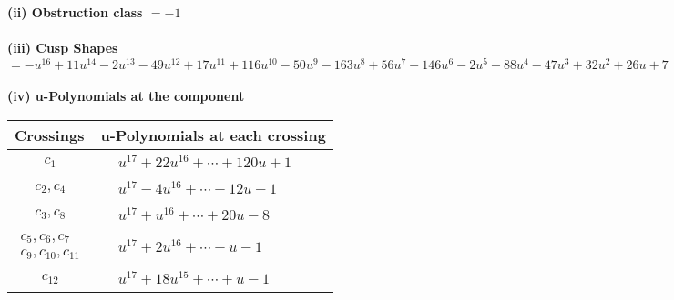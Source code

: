 \documentclass[1p]{elsarticle_modified}
\theoremstyle{definition}
\begin{document}
\flushleft \textbf{(ii) Obstruction class $= -1$}\\~\\
\flushleft \textbf{(iii) Cusp Shapes $= - u^{16}+11 u^{14}-2 u^{13}-49 u^{12}+17 u^{11}+116 u^{10}-50 u^9-163 u^8+56 u^7+146 u^6-2 u^5-88 u^4-47 u^3+32 u^2+26 u+7$}\\~\\
\newpage\renewcommand{\arraystretch}{1}
\flushleft \textbf{(iv) u-Polynomials at the component}\newline \\
\begin{tabular}{m{50pt}|m{274pt}}
Crossings & \hspace{64pt}u-Polynomials at each crossing \\
\hline $$\begin{aligned}c_{1}\end{aligned}$$&$\begin{aligned}
&u^{17}+22 u^{16}+\cdots+120 u+1
\end{aligned}$\\
\hline $$\begin{aligned}c_{2},c_{4}\end{aligned}$$&$\begin{aligned}
&u^{17}-4 u^{16}+\cdots+12 u-1
\end{aligned}$\\
\hline $$\begin{aligned}c_{3},c_{8}\end{aligned}$$&$\begin{aligned}
&u^{17}+u^{16}+\cdots+20 u-8
\end{aligned}$\\
\hline $$\begin{aligned}c_{5},c_{6},c_{7}\\c_{9},c_{10},c_{11}\end{aligned}$$&$\begin{aligned}
&u^{17}+2 u^{16}+\cdots- u-1
\end{aligned}$\\
\hline $$\begin{aligned}c_{12}\end{aligned}$$&$\begin{aligned}
&u^{17}+18 u^{15}+\cdots+u-1
\end{aligned}$\\
\hline
\end{tabular}\\~\\
\newpage\renewcommand{\arraystretch}{1}
\end{document}
